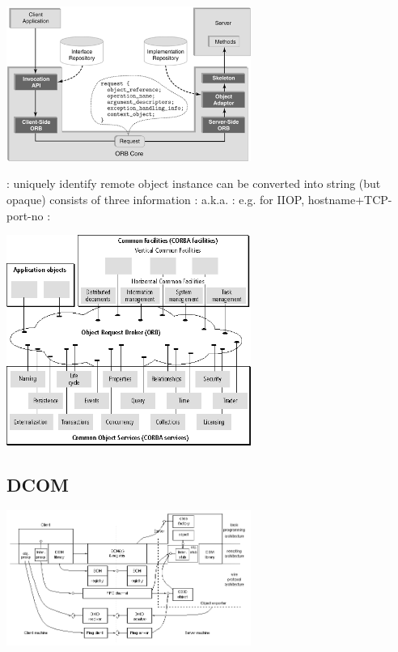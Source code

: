 \documentclass{myproc}
\begin{document}
\w {}
\begin{center}
\centerline{\includegraphics[width=8cm]{pics/corba-03}}
\end{center}

\w {}: uniquely identify remote object instance
  \bit
  \w can be converted into string (but opaque)
  \w consists of three information
     \bit
     \w {}: a.k.a. 
     \w {}: e.g. for IIOP, hostname+TCP-port-no
     \w {}:
     \eit
  \eit

\w {}
\begin{center}
\centerline{\includegraphics[width=8cm]{pics/corba-services}}
\end{center}
\eit

\subsection{DCOM}
\centerline{\includegraphics[width=8cm]{pics/dcom}}
\end{document}
